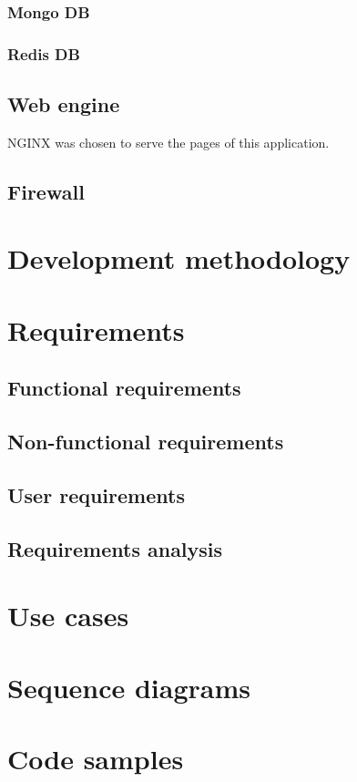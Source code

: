 \subsubsection{Mongo DB}

\subsubsection{Redis DB}

\subsection{Web engine}
NGINX was chosen to serve the pages of this application.

\subsection{Firewall}

\section{Development methodology}

\section{Requirements}

\subsection{Functional requirements}

\subsection{Non-functional requirements}

\subsection{User requirements}

\subsection{Requirements analysis}

\section{Use cases}

\section{Sequence diagrams}

\section{Code samples}
